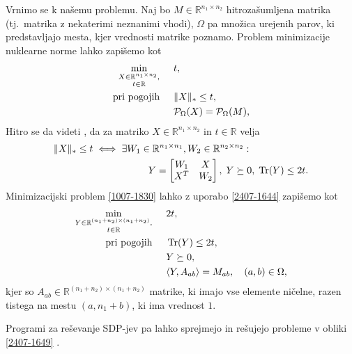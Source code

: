 Vrnimo se k našemu problemu. Naj bo $M \in \mathbb{R}^{n_1 \times n_2}$ hitrozašumljena matrika (tj.\ matrika z nekaterimi neznanimi vhodi), $\Omega$ pa množica urejenih parov, ki predstavljajo mesta, kjer vrednosti matrike poznamo.
Problem minimizacije nuklearne norme lahko zapišemo kot
\begin{align}
\label{1007-1830}
\begin{split}
    \min_{\substack{X\in \mathbb R^{n_1\times n_2},\\ t\in \mathbb R}} \hspace{0.5cm}        & t,                                               \\
    \text{pri pogojih} \hspace{0.5cm} & \lVert X\rVert_* \leq t,  \\
                                      & \mathcal{P}_\Omega(X) = \mathcal{P}_\Omega(M),
\end{split}
\end{align}
Hitro se da videti \cite[lema 2]{NNM-PHD}, da za matriko $X \in \mathbb{R}^{n_1 \times n_2}$ in $t \in \mathbb{R}$
velja 
\begin{align}
\label{2407-1644}
\begin{split}
\lVert X\rVert_* \leq t &\iff \exists W_1\in \mathbb{R}^{n_1 \times n_1}, W_2 \in \mathbb{R}^{n_2 \times n_2}:\\
&\hspace{2cm}
Y = \begin{bmatrix}
               W_1 & X                     \\
               X^T & W_2 
           \end{bmatrix},\;       Y \succeq 0,\; \operatorname{Tr}(Y) \leq 2t.
\end{split}
\end{align}
Minimizacijski problem \eqref{1007-1830} lahko z uporabo \eqref{2407-1644} zapišemo kot
\begin{align}
\label{2407-1649}
\begin{split}
    \min_{\substack{Y\in \mathbb R^{(n_1+n_2)\times (n_1+n_2)},\\ t\in \mathbb R}}     \hspace{0.5cm} & 2t,                        \\
    \text{pri pogojih} \hspace{0.5cm} & \operatorname{Tr}(Y) \leq 2t,           \\
                                  & Y \succeq 0,              \\
                                  & \langle Y, A_{ab} \rangle = M_{ab},\quad (a,b)\in \Omega,
\end{split}
\end{align}
kjer so $A_{ab} \in \mathbb{R}^{(n_1 + n_2) \times (n_1 + n_2)}$ matrike, ki imajo vse elemente ničelne, razen tistega na mestu $(a, n_1 + b)$, ki ima vrednost $1$.
\iffalse
Ker velja
\[
    \trOp{A}{B} = \sum_{i}^{n_1} \sum_{j}^{n_2} a_{ij}b_{ij}
\] je lahko videti, da je tak pogoj smiselen. 
\fi
Programi za reševanje SDP-jev pa lahko sprejmejo in rešujejo probleme v obliki \eqref{2407-1649}
\cite{Survey-NKS19}.


